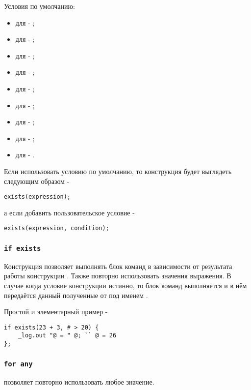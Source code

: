 \documentclass[a4paper, 14pt]{extarticle}
\newenvironment{icItems}
	{ \begin{itemize} [noitemsep,nolistsep] }
	{ \end{itemize} }
\begin{document}
Условия по умолчанию:
\begin{icItems}
	\item для  - ;
	\item для  - ;
	\item для  - ;
	\item для  - ;
	\item для  - ;
	\item для  - ;
	\item для  - ;
	\item для  - ;
	\item для  - .
\end{icItems}
	
Если использовать условию по умолчанию, то конструкция будет выглядеть следующим образом -
\begin{lstlisting}[numbers=none]
exists(expression);
\end{lstlisting}
а если добавить пользовательское условие -
\begin{lstlisting}[numbers=none]
exists(expression, condition);
\end{lstlisting}

\subsubsection{\lstinline`if exists`}

Конструкция  позволяет выполнять блок команд в зависимости от результата работы конструкции . Также повторно использовать значения выражения. В случае когда условие конструкции  истинно, то блок команд выполняется и в нём передаётся данный полученные от  под именем .
	
\indent Простой и элементарный пример -
\begin{lstlisting}[numbers=none]
if exists(23 + 3, # > 20) {
	_log.out "@ = " @; `` @ = 26 
};
\end{lstlisting}

\subsubsection{\lstinline`for any`}

 позволяет повторно использовать любое значение.
	
\end{document}
